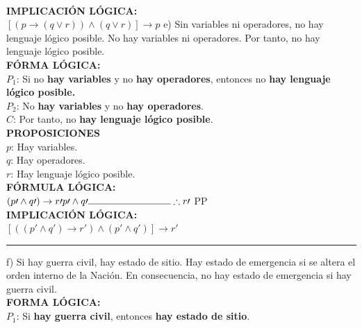 \documentclass[letterpaper,12pt]{article}
\begin{document}
\begin{sloppypar}
\vspace{0.3cm}\\ 
\textbf{IMPLICACIÓN LÓGICA:} \\ 
$[(p \rightarrow (q \vee r)) \wedge (q \vee r)] \rightarrow p$
\newpage
e) Sin variables ni operadores, no hay lenguaje lógico posible. No hay variables ni operadores. Por tanto, no
hay lenguaje lógico posible.
\vspace{0.3cm}\\ 
\textbf{FÓRMA LÓGICA:} \\ 
$P_1$: Si no \textcolor[rgb]{1,0,0}{\textbf{hay variables}} y no \textcolor[rgb]{0.2,0.5,0.7}{\textbf{hay operadores}}, entonces no \textcolor[rgb]{0.2,0.7,0.5}{\textbf{hay lenguaje lógico posible.}}\\
$P_2$: No \textcolor[rgb]{1,0,0}{\textbf{hay variables}} y no \textcolor[rgb]{0.2,0.5,0.7}{\textbf{hay operadores}}. \\ 
$C$: Por tanto, no \textcolor[rgb]{0.2,0.7,0.5}{\textbf{hay lenguaje lógico posible}}. 
\vspace{0.3cm}\\ 
\textbf{PROPOSICIONES} \\ 
$p$: Hay variables. \\ 
$q$: Hay operadores. \\ 
$r$: Hay lenguaje lógico posible. 
\vspace{0.3cm}\\ 
\textbf{FÓRMULA LÓGICA:} \\ 
$(p\prime \wedge q\prime) \rightarrow r\prime \\p\prime \wedge q\prime \\ \noindent\rule{3cm}{0.4pt} \\ \therefore r\prime $ PP
\vspace{0.3cm}\\ 
\textbf{IMPLICACIÓN LÓGICA:} \\ 
$[((p\prime \wedge q\prime) \rightarrow r\prime) \wedge (p\prime \wedge q\prime)]\rightarrow r\prime$
\vspace{0.3cm} 
\hrule 
\vspace{0.3cm} 
f) Si hay guerra civil, hay estado de sitio. Hay estado de emergencia si se altera el orden interno de la Nación.
En consecuencia, no hay estado de emergencia si hay guerra civil.
\vspace{0.3cm}\\ 
\textbf{FORMA LÓGICA:} \\ 
$P_1$: Si \textcolor[rgb]{1,0,0}{\textbf{hay guerra civil}}, entonces \textcolor[rgb]{0.2,0.5,0.7}{\textbf{hay estado de sitio}}.\\ 

\end{sloppypar}
\end{document}
